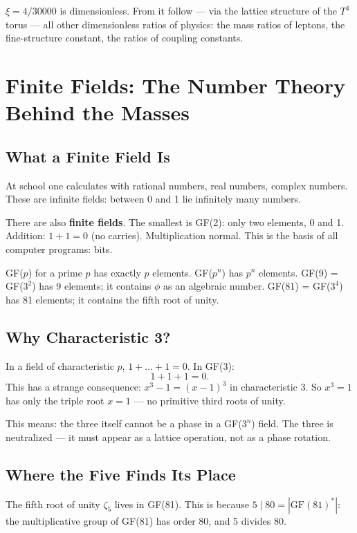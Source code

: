 \documentclass[12pt,oneside]{book}
\begin{document}
$\xi = 4/30000$ is dimensionless. From it follow --- via the lattice structure of the $T^4$ torus --- all other dimensionless ratios of physics: the mass ratios of leptons, the fine-structure constant, the ratios of coupling constants.

\chapter{Finite Fields: The Number Theory Behind the Masses}

\section{What a Finite Field Is}

At school one calculates with rational numbers, real numbers, complex numbers. These are infinite fields: between 0 and 1 lie infinitely many numbers.

There are also \textbf{finite fields}. The smallest is GF(2): only two elements, 0 and 1. Addition: $1 + 1 = 0$ (no carries). Multiplication normal. This is the basis of all computer programs: bits.

GF($p$) for a prime $p$ has exactly $p$ elements. GF($p^n$) has $p^n$ elements. GF(9) = GF($3^2$) has 9 elements; it contains $\phi$ as an algebraic number. GF(81) = GF($3^4$) has 81 elements; it contains the fifth root of unity.

\section{Why Characteristic 3?}

In a field of characteristic $p$, $1 + \dots + 1 = 0$. In GF(3):
\[
1 + 1 + 1 = 0.
\]
This has a strange consequence: $x^3 - 1 = (x - 1)^3$ in characteristic 3. So $x^3 = 1$ has only the triple root $x = 1$ --- no primitive third roots of unity.

This means: the three itself cannot be a phase in a GF($3^n$) field. The three is neutralized --- it must appear as a lattice operation, not as a phase rotation.

\section{Where the Five Finds Its Place}

The fifth root of unity $\zeta_5$ lives in GF(81). This is because $5 \mid 80 = |\text{GF}(81)^*|$: the multiplicative group of GF(81) has order 80, and 5 divides 80.
\end{document}
